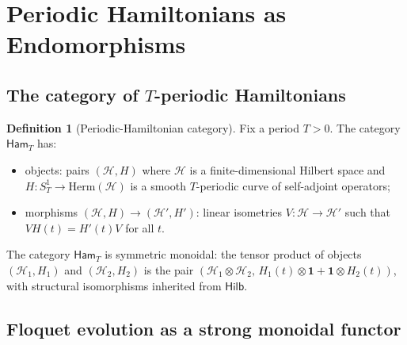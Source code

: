 \documentclass[12pt]{article}
\theoremstyle{definition}
\newtheorem{definition}[theorem]{Definition}
\theoremstyle{remark}
\newcommand{\Hcal}{\mathcal{H}}
\newcommand{\one}{\mathbf{1}}
\newcommand{\Ham}{\mathsf{Ham}}
\newcommand{\Hilb}{\mathsf{Hilb}}
\begin{document}
\section{Periodic Hamiltonians as Endomorphisms}
\label{sec:periodic-endo}

\subsection{The category of \texorpdfstring{$T$}{T}-periodic Hamiltonians}

\begin{definition}[Periodic-Hamiltonian category]
\label{def:phamcat}
Fix a period $T>0$. The category $\Ham_T$ has:
\begin{itemize}
\item objects: pairs $(\Hcal,H)$ where $\Hcal$ is a finite-dimensional Hilbert space and $H\colon S^1_T\to\mathrm{Herm}(\Hcal)$ is a smooth $T$-periodic curve of self-adjoint operators;
\item morphisms $(\Hcal,H)\to(\Hcal',H')$: linear isometries $V\colon\Hcal\to\Hcal'$ such that $VH(t)=H'(t)V$ for all $t$.
\end{itemize}
\end{definition}

The category $\Ham_T$ is symmetric monoidal: the tensor product of objects $(\Hcal_1,H_1)$ and $(\Hcal_2,H_2)$ is the pair $(\Hcal_1\otimes\Hcal_2,\,H_1(t)\otimes\one+\one\otimes H_2(t))$, with structural isomorphisms inherited from $\Hilb$.

\subsection{Floquet evolution as a strong monoidal functor}
\end{document}
